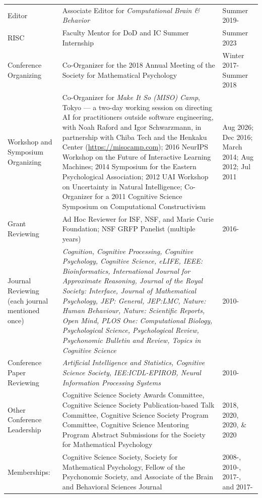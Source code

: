 \documentclass[a4paper,10pt]{article}
\begin{document}
\begin{tabu}{p{9em}<{\RaggedRight}Xp{8em}<{\RaggedRight}}
Editor & Associate Editor for {\em Computational Brain \& Behavior} & Summer 2019- \\
RISC & Faculty Mentor for DoD and IC Summer Internship & Summer 2023 \\

Conference Organizing & Co-Organizer for the 2018 Annual Meeting of the Society for Mathematical Psychology & Winter 2017-Summer 2018 \\

Workshop and Symposium Organizing & Co-Organizer for {\em Make It So (MISO) Camp}, Tokyo --- a two-day working session on directing AI for practitioners outside software engineering, with Noah Raford and Igor Schwarzmann, in partnership with Chiba Tech and the Henkaku Center (\url{https://misocamp.com}); 2016 NeurIPS Workshop on the Future of Interactive Learning Machines; 2014 Symposium for the Eastern Psychological Association; 2012 UAI Workshop on Uncertainty in Natural Intelligence; Co-Organizer for a 2011 Cognitive Science Symposium on Computational Constructivism & Aug 2026; Dec 2016; March 2014; Aug 2012; Jul 2011 \\

Grant Reviewing & Ad Hoc Reviewer for ISF, NSF, and Marie Curie Foundation; NSF GRFP Panelist (multiple years) & 2016- \\

Journal Reviewing (each journal mentioned once) & {\em Cognition, Cognitive Processing, Cognitive Psychology, Cognitive Science, eLIFE, IEEE: Bioinformatics, International Journal for Approximate Reasoning, Journal of the Royal Society: Interface, Journal of Mathematical Psychology, JEP: General, JEP:LMC, Nature: Human Behaviour, Nature: Scientific Reports, Open Mind, PLOS One: Computational Biology, Psychological Science, Psychological Review, Psychonomic Bulletin and Review, Topics in Cognitive Science} & 2010- \\

Conference Paper Reviewing & {\em Artificial Intelligence and Statistics, Cognitive Science Society, IEE:ICDL-EPIROB, Neural Information Processing Systems} & 2010- \\

Other Conference Leadership & Cognitive Science Society Awards Committee, Cognitive Science Society Publication-based Talk Committee, Cognitive Science Society Program Committee, Cognitive Science Mentoring Program Abstract Submissions for the Society for Mathematical Psychology & 2018, 2020, 2020, \& 2020 \\

Memberships: & Cognitive Science Society, Society for Mathematical Psychology, Fellow of the Psychonomic Society, and Associate of the Brain and Behavioral Sciences Journal & 2008-, 2010-, 2017-, and 2017-

\end{tabu}
\end{document}

